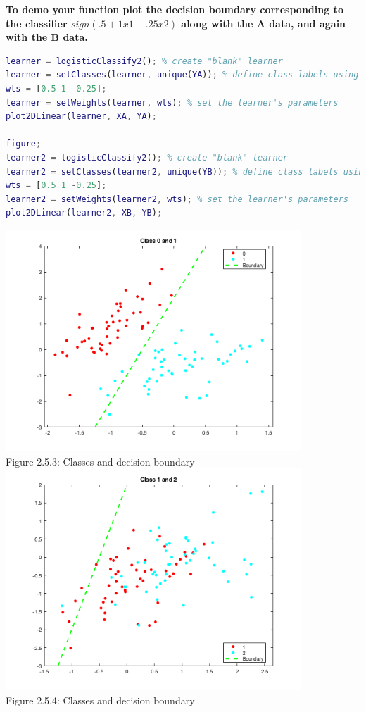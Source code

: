 \documentclass[]{scrreprt}   %
\begin{document}
\textbf{To demo your function plot the decision boundary corresponding to the classifier $sign(.5 + 1x 1 - .25x 2 )$ along with the A data, and again with the B data.}

\begin{lstlisting}[language=Matlab]
learner = logisticClassify2(); % create "blank" learner 
learner = setClasses(learner, unique(YA)); % define class labels using YA or YB 
wts = [0.5 1 -0.25]; 
learner = setWeights(learner, wts); % set the learner's parameters
plot2DLinear(learner, XA, YA);

figure;
learner2 = logisticClassify2(); % create "blank" learner 
learner2 = setClasses(learner2, unique(YB)); % define class labels using YA or YB 
wts = [0.5 1 -0.25]; 
learner2 = setWeights(learner2, wts); % set the learner's parameters
plot2DLinear(learner2, XB, YB);
\end{lstlisting}
\bigbreak
\begin{center}
	\includegraphics[width=30em,keepaspectratio]{p5figure3.png}\\
	{Figure 2.5.3: Classes and decision boundary}
	\includegraphics[width=30em,keepaspectratio]{p5figure4.png}\\
	{Figure 2.5.4: Classes and decision boundary}
\end{center} 
\end{document}
